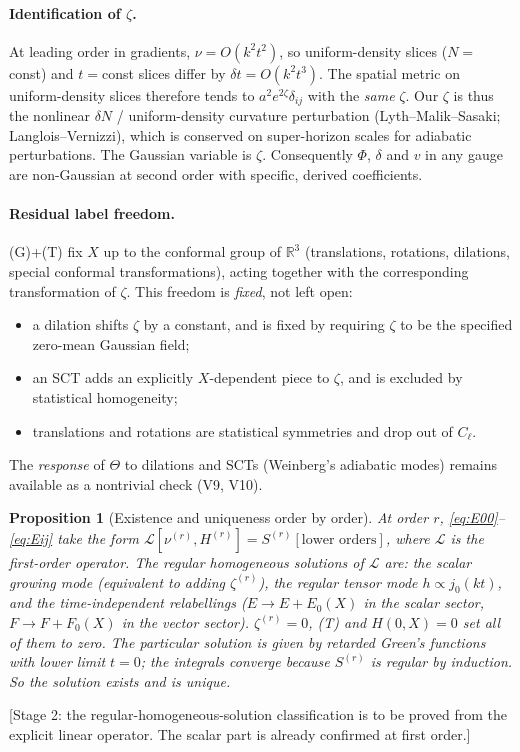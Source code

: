 \documentclass[11pt]{article}
\newtheorem{proposition}{Proposition}
\theoremstyle{definition}
\theoremstyle{remark}
\newcommand{\status}[1]{\textsf{[#1]}}
\begin{document}
\paragraph{Identification of $\zeta$.} At leading order in gradients,
$\nu=O(k^2t^2)$, so uniform-density slices ($N=$const) and $t=$const slices
differ by $\delta t=O(k^2t^3)$. The spatial metric on uniform-density slices
therefore tends to $a^2e^{2\zeta}\delta_{ij}$ with the \emph{same} $\zeta$.
Our $\zeta$ is thus the nonlinear $\delta N$ / uniform-density curvature
perturbation (Lyth--Malik--Sasaki; Langlois--Vernizzi), which is conserved on
super-horizon scales for adiabatic perturbations. The Gaussian variable is
$\zeta$. Consequently $\Phi$, $\delta$ and $v$ in any gauge are non-Gaussian
at second order with specific, derived coefficients.

\paragraph{Residual label freedom.} (G)+(T) fix $X$ up to the conformal group
of $\mathbb R^3$ (translations, rotations, dilations, special conformal
transformations), acting together with the corresponding transformation of
$\zeta$. This freedom is \emph{fixed}, not left open:
\begin{itemize}
\item a dilation shifts $\zeta$ by a constant, and is fixed by requiring
$\zeta$ to be the specified zero-mean Gaussian field;
\item an SCT adds an explicitly $X$-dependent piece to $\zeta$, and is
excluded by statistical homogeneity;
\item translations and rotations are statistical symmetries and drop out of
$C_\ell$.
\end{itemize}
The \emph{response} of $\Theta$ to dilations and SCTs (Weinberg's adiabatic
modes) remains available as a nontrivial check (V9, V10).

\begin{proposition}[Existence and uniqueness order by order]\label{prop:unique}
At order $r$, \eqref{eq:E00}--\eqref{eq:Eij} take the form
$\mathcal L[\nu^{(r)},H^{(r)}]=S^{(r)}[\text{lower orders}]$, where
$\mathcal L$ is the first-order operator. The regular homogeneous solutions
of $\mathcal L$ are: the scalar growing mode (equivalent to adding
$\zeta^{(r)}$), the regular tensor mode $h\propto j_0(kt)$, and the
time-independent relabellings ($E\to E+E_0(X)$ in the scalar sector,
$F\to F+F_0(X)$ in the vector sector). $\zeta^{(r)}=0$, (T) and $H(0,X)=0$
set all of them to zero. The particular solution is given by retarded Green's functions with
lower limit $t=0$; the integrals converge because $S^{(r)}$ is regular by
induction. So the solution exists and is unique.
\end{proposition}
\status{Stage 2: the regular-homogeneous-solution classification is to be
proved from the explicit linear operator. The scalar part is already
confirmed at first order.}
\end{document}
